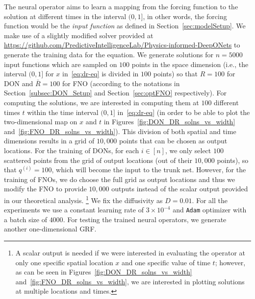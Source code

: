 The neural operator aims to learn a mapping from the forcing function to the solution at different times in the interval $(0,1]$, in other words, the forcing function would be the \emph{input function} as defined in Section~\ref{sec:modelSetup}. We make use of a slightly modified solver provided at \url{https://github.com/PredictiveIntelligenceLab/Physics-informed-DeepONets} to generate the training data for the equation. We generate solutions for $n=5000$ input functions which are sampled on $100$ points in the space dimension (i.e., the interval $(0,1]$ for $x$ in~\eqref{eq:dr-eq} is divided in $100$ points) so that $R=100$ for DON and $\bar{R}=100$ for FNO (according to the notations in Section~\ref{subsec:DON_Setup} and Section~\ref{sec:optFNO} respectively). For computing the solutions, we are interested in computing them at $100$ different times $t$ within the time interval $(0,1]$ in~\eqref{eq:dr-eq} (in order to be able to plot the two-dimensional map on $x$ and $t$ in Figures~\ref{fig:DON_DR_solns_vs_width} and~\ref{fig:FNO_DR_solns_vs_width}). This division of both spatial and time dimensions results in a grid of $10,000$ points that can be chosen as output locations.
%
For the training of DONs, for each $i\in[n]$, we only select $100$ scattered points from the grid of output locations (out of their $10,000$ points), so that $q^{(i)}=100$, which will become the input to the trunk net. 
However, for the training of FNOs, we do choose the full grid as output locations and thus we modify the FNO to provide $10,000$ outputs instead of the scalar output provided in our theoretical analysis.%
\footnote{A scalar output is needed if we were interested in evaluating the operator at only one specific spatial location $x$ and one specific value of time $t$; however, as can be seen in Figures~\ref{fig:DON_DR_solns_vs_width} and~\ref{fig:FNO_DR_solns_vs_width}, we are interested in plotting solutions at multiple locations and times.} We fix the diffusivity as $D = 0.01$.
%
%
For all the experiments we use a constant learning rate of $3\times 10^{-4}$ and \texttt{Adam} optimizer with a batch size of $4000$. 
For testing the trained neural operators, we generate another one-dimensional GRF. 

